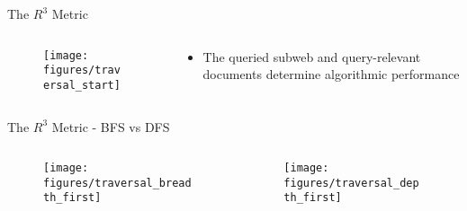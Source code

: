 \begin{frame}{The $ R^{3} $ Metric}
    \begin{columns}[T] %
        \begin{column}{.48\textwidth}

       \begin{figure}
            \centering
            \texttt{[image: figures/traversal\_start]}
        \end{figure}

        \end{column}%
        \hfill%
        \begin{column}{.48\textwidth}
            \bigskip
            \begin{itemize}
                \item The queried subweb and query-relevant documents determine algorithmic performance
            \end{itemize}
        \end{column}%
    \end{columns}
\end{frame}

\begin{frame}{The $ R^{3} $ Metric - BFS vs DFS}
    \begin{columns}[T] %
        \begin{column}{.48\textwidth}

       \begin{figure}
            \centering
            \texttt{[image: figures/traversal\_breadth\_first]}
        \end{figure}

        \end{column}%
        \hfill%
        \begin{column}{.48\textwidth}
            \begin{figure}
                \centering
                \texttt{[image: figures/traversal\_depth\_first]}
            \end{figure}    
        \end{column}%
    \end{columns}
\end{frame}


